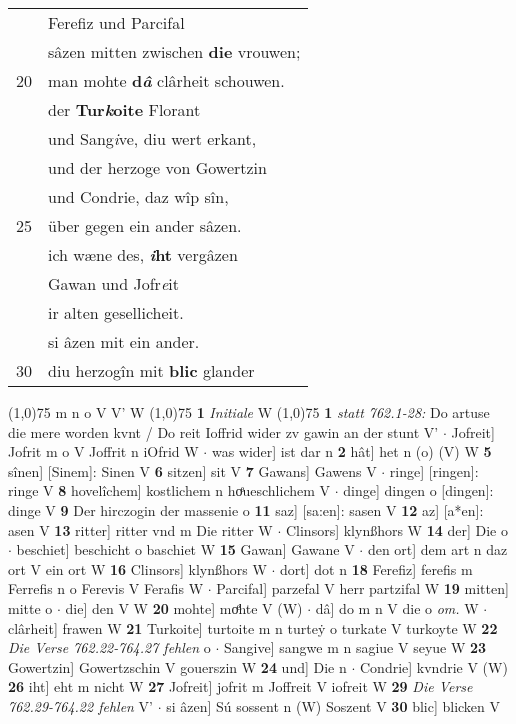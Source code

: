 \documentclass[8pt,a4paper,notitlepage]{article}
\begin{document}
\begin{table}[ht]
\begin{minipage}[t]{0.5\linewidth}
\begin{tabular}{rl}
 & Ferefiz und Parcifal\\ 
 & sâzen mitten zwischen \textbf{die} vrouwen;\\ 
20 & man mohte \textbf{d\textit{â}} clârheit schouwen.\\ 
 & der \textbf{Tur\textit{k}oite} Florant\\ 
 & und Sang\textit{i}ve, diu wert erkant,\\ 
 & und der herzoge von Gowertzin\\ 
 & und Condrie, daz wîp sîn,\\ 
25 & über gegen ein ander sâzen.\\ 
 & ich wæne des, \textbf{\textit{i}ht} vergâzen\\ 
 & Gawan und Jofr\textit{e}it\\ 
 & ir alten gesellicheit.\\ 
 & si âzen mit ein ander.\\ 
30 & diu herzogîn mit \textbf{blic} glander\\ 
\end{tabular}
\scriptsize
\line(1,0){75} \newline
m n o V V' W \newline
\line(1,0){75} \newline
\textbf{1} \textit{Initiale} W  \newline
\line(1,0){75} \newline
\textbf{1} \textit{statt 762.1-28:} Do artuse die mere worden kvnt / Do reit Ioffrid wider zv gawin an der stunt V'   $\cdot$ Jofreit] Jofrit m o V Joffrit n iOfrid W  $\cdot$ was wider] ist dar n \textbf{2} hât] het n (o) (V) W \textbf{5} sînen] [Sinem]: Sinen V \textbf{6} sitzen] sit V \textbf{7} Gawans] Gawens V  $\cdot$ ringe] [ringen]: ringe V \textbf{8} hovelîchem] kostlichem n hoͤueschlichem V  $\cdot$ dinge] dingen o [dingen]: dinge V \textbf{9} Der hirczogin der massenie o \textbf{11} saz] [sa:en]: sasen V \textbf{12} az] [a*en]: asen V \textbf{13} ritter] ritter vnd m Die ritter W  $\cdot$ Clinsors] klynßhors W \textbf{14} der] Die o  $\cdot$ beschiet] beschicht o baschiet W \textbf{15} Gawan] Gawane V  $\cdot$ den ort] dem art n daz ort V ein ort W \textbf{16} Clinsors] klynßhors W  $\cdot$ dort] dot n \textbf{18} Ferefiz] ferefis m Ferrefis n o Ferevis V Ferafis W  $\cdot$ Parcifal] parzefal V herr partzifal W \textbf{19} mitten] mitte o  $\cdot$ die] den V W \textbf{20} mohte] moͤhte V (W)  $\cdot$ dâ] do m n V die o \textit{om.} W  $\cdot$ clârheit] frawen W \textbf{21} Turkoite] turtoite m n turteẏ o turkate V turkoyte W \textbf{22} \textit{Die Verse 762.22-764.27 fehlen} o   $\cdot$ Sangive] sangwe m n sagiue V seyue W \textbf{23} Gowertzin] Gowertzschin V gouerszin W \textbf{24} und] Die n  $\cdot$ Condrie] kvndrie V (W) \textbf{26} iht] eht m nicht W \textbf{27} Jofreit] jofrit m Joffreit V iofreit W \textbf{29} \textit{Die Verse 762.29-764.22 fehlen} V'   $\cdot$ si âzen] Sú sossent n (W) Soszent V \textbf{30} blic] blicken V \newline
\end{minipage}
\end{table}
\end{document}
